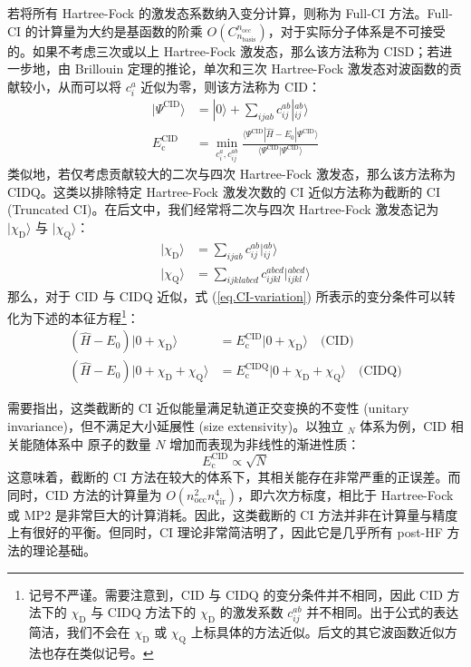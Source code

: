 若将所有 Hartree-Fock 的激发态系数纳入变分计算，则称为 Full-CI 方法。Full-CI 的计算量为大约是基函数的阶乘 $O(C_{n_\mathrm{basis}}^{n_\mathrm{occ}})$，对于实际分子体系是不可接受的。如果不考虑三次或以上 Hartree-Fock 激发态，那么该方法称为 CISD；若进一步地，由 Brillouin 定理的推论，单次和三次 Hartree-Fock 激发态对波函数的贡献较小，从而可以将 $c_i^a$ 近似为零，则该方法称为 CID：
\begin{align}
  | \Psi^\text{CID} \rangle &= | 0 \rangle + \sum_{ijab} c_{ij}^{ab} | {}_{ij}^{ab} \rangle \\
  E_\mathrm{c}^\mathrm{CID} &= \min_{c_i^a, c_{ij}^{ab}} \frac{\langle \Psi^\mathrm{CID} | \hat H - E_0 | \Psi^\mathrm{CID} \rangle}{\langle \Psi^\mathrm{CID} | \Psi^\mathrm{CID} \rangle}
\end{align}
类似地，若仅考虑贡献较大的二次与四次 Hartree-Fock 激发态，那么该方法称为 CIDQ。这类以排除特定 Hartree-Fock 激发次数的 CI 近似方法称为截断的 CI (Truncated CI)。在后文中，我们经常将二次与四次 Hartree-Fock 激发态记为 $| \chi_\mathrm{D} \rangle$ 与 $| \chi_\mathrm{Q} \rangle$：
\begin{align}
  \label{eq.ci-chi-d}
  | \chi_\mathrm{D} \rangle &= \sum_{ijab} c_{ij}^{ab} | {}_{ij}^{ab} \rangle \\
  \label{eq.ci-chi-q}
  | \chi_\mathrm{Q} \rangle &= \sum_{ijklabcd} c_{ijkl}^{abcd} | {}_{ijkl}^{abcd} \rangle
\end{align}
那么，对于 CID 与 CIDQ 近似，式 (\ref{eq.CI-variation}) 所表示的变分条件可以转化为下述的本征方程\footnote{记号不严谨。需要注意到，CID 与 CIDQ 的变分条件并不相同，因此 CID 方法下的 $\chi_\mathrm{D}$ 与 CIDQ 方法下的 $\chi_\mathrm{D}$ 的激发系数 $c_{ij}^{ab}$ 并不相同。出于公式的表达简洁，我们不会在 $\chi_\mathrm{D}$ 或 $\chi_\mathrm{Q}$ 上标具体的方法近似。后文的其它波函数近似方法也存在类似记号。}：
\begin{align}
  \label{eq.CID-eigen}
  (\hat H - E_0) | 0 + \chi_\mathrm{D} \rangle &= E_\mathrm{c}^\mathrm{CID} | 0 + \chi_\mathrm{D} \rangle \quad \text{(CID)} \\
  \label{eq.CIDQ-eigen}
  (\hat H - E_0) | 0 + \chi_\mathrm{D} + \chi_\mathrm{Q} \rangle &= E_\mathrm{c}^\mathrm{CIDQ} | 0 + \chi_\mathrm{D} + \chi_\mathrm{Q} \rangle \quad \text{(CIDQ)}
\end{align}

需要指出，这类截断的 CI 近似能量满足轨道正交变换的不变性 (unitary invariance)，但不满足大小延展性 (size extensivity)。以独立 $_{N}$ 体系为例，CID 相关能随体系中  原子的数量 $N$ 增加而表现为非线性的渐进性质\cite{Ahlrichs-Ahlrichs.CPC.1979, Szabo-Ostlund.Dover.1996}：
\begin{equation}
  E_\mathrm{c}^\mathrm{CID} \propto \sqrt{N}
\end{equation}
这意味着，截断的 CI 方法在较大的体系下，其相关能存在非常严重的正误差。而同时，CID 方法的计算量为 $O(n_\mathrm{occ}^2 n_\mathrm{vir}^4)$，即六次方标度，相比于 Hartree-Fock 或 MP2 是非常巨大的计算消耗。因此，这类截断的 CI 方法并非在计算量与精度上有很好的平衡。但同时，CI 理论非常简洁明了，因此它是几乎所有 post-HF 方法的理论基础。

